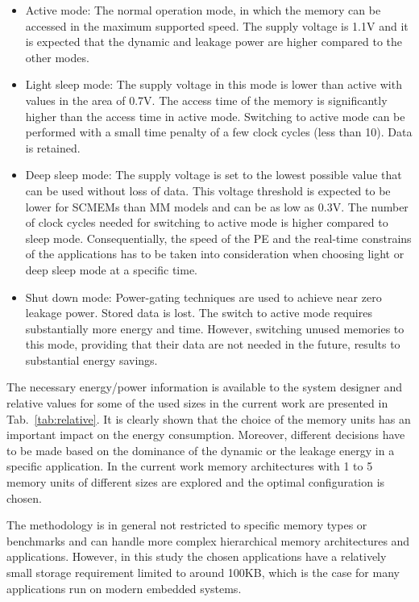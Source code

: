 \documentclass{acm_proc_article-sp}
\begin{document}
\begin{itemize}
\item Active mode: The normal operation mode, in which the memory can be accessed in the maximum supported speed. The supply voltage is 1.1V and it is expected that the dynamic and leakage power are higher compared to the other modes.
\item Light sleep mode: The supply voltage in this mode is lower than active with values in the area of 0.7V. The access time of the memory is significantly higher than the access time in active mode. Switching to active mode can be performed with a small time penalty of a few clock cycles (less than 10). Data is retained.  
\item Deep sleep mode: The supply voltage is set to the lowest possible value that can be used without loss of data. This voltage threshold is expected to be lower for SCMEMs than MM models and can be as low as 0.3V. The number of clock cycles needed for switching to active mode is higher compared to sleep mode. Consequentially, the speed of the PE and the real-time constrains of the applications has to be taken into consideration when choosing light or deep sleep mode at a specific time.  
\item Shut down mode: Power-gating techniques are used to achieve near zero leakage power. Stored data is lost. The switch to active mode requires substantially more energy and time. However, switching unused memories to this mode, providing that their data are not needed in the future, results to substantial energy savings.
\end{itemize}  

The necessary energy/power information is available to the system designer and relative values for some of the used sizes in the current work are presented in Tab.~\ref{tab:relative}. It is clearly shown that the choice of the memory units has an important impact on the energy consumption. Moreover, different decisions have to be made based on the dominance of the dynamic or the leakage energy in a specific application. In the current work memory architectures with 1 to 5 memory units  of different sizes are explored and the optimal configuration is chosen.

The methodology is in general not restricted to specific memory types or benchmarks and can handle more complex hierarchical memory architectures and applications. However, in this study the chosen applications have a relatively small storage requirement limited to around 100KB, which is the case for many applications run on modern embedded systems. 
\end{document}

